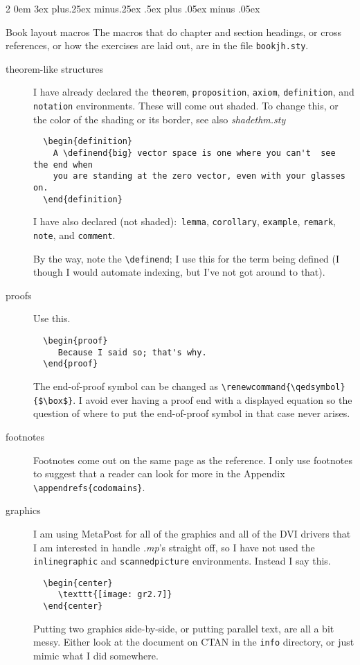 \documentclass[titlepage]{article}
\makeatletter
\renewcommand{\subsection}{\@startsection{subsection}%
  {2}%
  {0em}%
  {3ex plus.25ex minus.25ex}%
  {.5ex plus .05ex minus .05ex}%
  {\large\bfseries\raggedright}}
\makeatother
\begin{document}
\subsection{Book layout macros}
The macros that do chapter and section headings, or cross references,
or how the exercises are laid out, are in the file 
\texttt{bookjh.sty}.


\begin{description}
  \item[theorem-like structures]
    I have already declared the
    \texttt{theorem}, \texttt{proposition}, 
    \texttt{axiom}, \texttt{definition}, and \texttt{notation}
    environments.
    These will come out shaded.
    To change this, or the color of the shading or its border, see
    also \textit{shadethm.sty}
\begin{verbatim}
  \begin{definition}
    A \definend{big} vector space is one where you can't  see the end when 
    you are standing at the zero vector, even with your glasses on. 
  \end{definition}
\end{verbatim}
    I have also declared (not shaded):~\texttt{lemma}, 
    \texttt{corollary}, \texttt{example},
    \texttt{remark}, \texttt{note}, and \texttt{comment}.

    By the way, note the \verb!\definend!; I use this for the
    term being defined (I though I would automate indexing,
    but I've not got around to that).

  \item[proofs]
    Use this.
\begin{verbatim}
  \begin{proof}
     Because I said so; that's why.
  \end{proof}
\end{verbatim}
   The end-of-proof symbol can be changed as
   \verb!\renewcommand{\qedsymbol}{$\box$}!.
   I avoid ever having a proof end with a displayed equation
   so the question of
   where to put the end-of-proof symbol in that case never arises.

  \item[footnotes]
    Footnotes come out on the same page as the reference.
    I only use footnotes 
    to suggest that a reader can look for more in the Appendix
    \verb!\appendrefs{codomains}!.

  \item[graphics]
    I am using MetaPost for all of the graphics and all of the 
    DVI drivers that I am interested in handle \textit{.mp}'s straight off, 
    so I have not used the \verb!inlinegraphic! and
    \verb!scannedpicture! environments.
    Instead I say this.
\begin{verbatim}
  \begin{center}
     \texttt{[image: gr2.7]}
  \end{center}
\end{verbatim}
   Putting two graphics side-by-side, or putting parallel text, are
   all a bit messy.
   Either look at the document on CTAN in the \texttt{info} directory,
   or just mimic what I did somewhere.


\end{description}
\end{document}
